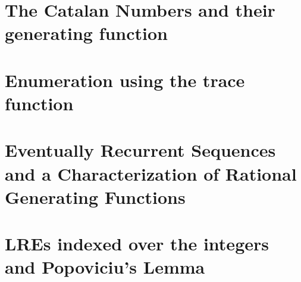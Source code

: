 \section{The Catalan Numbers and their generating function}

\section{Enumeration using the trace function}

\section{Eventually Recurrent Sequences and a Characterization of Rational Generating Functions}

\section{LREs indexed over the integers and Popoviciu's Lemma}


